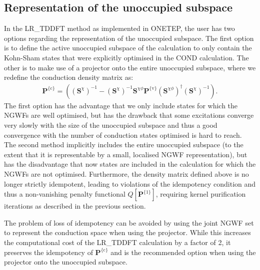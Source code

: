 \documentclass[letterpaper,10pt,english]{sphinxmanual}
\begin{document}
\subsection{Representation of the unoccupied subspace}
\label{\detokenize{lr_tddft:representation-of-the-unoccupied-subspace}}
In the LR\_TDDFT method as implemented in ONETEP, the user has two
options regarding the representation of the unoccupied subspace. The
first option is to define the active unoccupied subspace of the
calculation to only contain the Kohn-Sham states that were explicitly
optimised in the COND calculation. The other is to make use of a
projector onto the entire unoccupied subspace, where we redefine the
conduction density matrix as:
\begin{equation*}
\begin{split}\textbf{P}^{\{\textrm{c}\}}=\left(\left(\textbf{S}^{\chi}\right)^{-1} -\left(\textbf{S}^{\chi}\right)^{-1}\textbf{S}^{\chi\phi}\textbf{P}^{\{\textrm{v}\}}\left(\textbf{S}^{\chi\phi}\right)^\dagger \left(\textbf{S}^{\chi}\right)^{-1}\right) .\end{split}
\end{equation*}
The first option has the advantage that we only include states for
which the NGWFs are well optimised, but has the drawback that some
excitations converge very slowly with the size of the unoccupied
subspace and thus a good convergence with the number of conduction
states optimised is hard to reach. The second method implicitly includes
the entire unoccupied subspace (to the extent that it is representable
by a small, localised NGWF representation), but has the disadvantage
that now states are included in the calculation for which the NGWFs are
not optimised. Furthermore, the density matrix defined above is no
longer strictly idempotent, leading to violations of the idempotency
condition and thus a non-vanishing penalty functional
\(Q\left[\textbf{P}^{\{1\}}\right]\), requiring kernel purification
iterations as described in the previous section.

The problem of loss of idempotency can be avoided by using the joint
NGWF set to represent the conduction space when using the projector.
While this increases the computational cost of the LR\_TDDFT calculation
by a factor of 2, it preserves the idempotency of
\(\textbf{P}^{\{\textrm{c}\}}\) and is the recommended option when
using the projector onto the unoccupied subspace.
\end{document}
